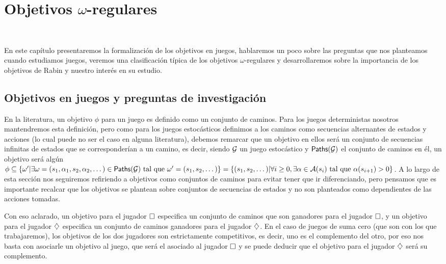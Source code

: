 \chapter{Objetivos $\omega$-regulares}
~\label{cap:objetivos}
\vspace{-1cm}


En este capítulo presentaremos la formalización de los objetivos en juegos,
hablaremos un poco sobre las preguntas que nos planteamos cuando estudiamos
juegos, veremos una clasificación típica de los objetivos $\omega$-regulares y
desarrollaremos sobre la importancia de los objetivos de Rabin y nuestro
interés en su estudio.

\section{Objetivos en juegos y preguntas de investigación}

En la literatura, un objetivo $\phi$ para un juego es definido como un conjunto
de caminos. Para los juegos deterministas nosotros mantendremos esta
definición, pero como para los juegos estocásticos definimos a los caminos como
secuencias alternantes de estados y acciones (lo cual puede no ser el caso en
alguna literatura), debemos remarcar que un objetivo en ellos será un conjunto
de secuencias infinitas de estados que se corresponderían a un camino, es
decir, siendo $\mathcal{G}$ un juego estocástico y $\textsf{Paths}(\mathcal{G})$ el conjunto de caminos
en él, un objetivo será algún $\phi \subseteq \{\omega' | \exists \omega =
	(s_1, \alpha_1, s_2, \alpha_2, \dots) \in \textsf{Paths}(\mathcal{G}) \text{ tal que } \omega' =
	(s_1, s_2, \dots)\} = \{(s_1, s_2, \dots) | \forall i \geq 0, \exists \alpha
	\in \mathcal{A}(s_i) \text{ tal que } \alpha(s_{i+1}) > 0\}$. A lo largo de esta
sección nos seguiremos refiriendo a objetivos como conjuntos de caminos para
evitar tener que ir diferenciando, pero pensamos que es importante recalcar que
los objetivos se plantean sobre conjuntos de secuencias de estados y no son
planteados como dependientes de las acciones tomadas.

Con eso aclarado, un objetivo para el jugador $\square$ especifica un conjunto de
caminos que son ganadores para el jugador $\square$, y un objetivo para el
jugador $\diamondsuit$ especifica un conjunto de caminos ganadores para el jugador
$\diamondsuit$. En el caso de juegos de suma cero (que son con los que trabajaremos),
los objetivos de los dos jugadores son estrictamente competitivos, es decir,
uno es el complemento del otro, por eso nos basta con asociarle un objetivo al
juego, que será el asociado al jugador $\square$ y se puede deducir que el
objetivo para el jugador $\diamondsuit$ será su complemento.

